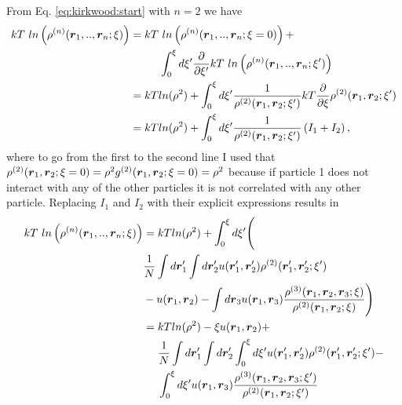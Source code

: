 From Eq. \eqref{eq:kirkwood:start} with $n=2$ we have
\begin{align}
kT~ln\left(\rho^{(n)}(\boldsymbol{r}_1,..,\boldsymbol{r}_n;\xi)\right) &=
     kT~ln\left(\rho^{(n)}(\boldsymbol{r}_1,..,\boldsymbol{r}_n;\xi=0)\right) + \nonumber \\
    &~~~~~~~~ \int_0^\xi d\xi' \frac{\partial}{\partial \xi'}
    kT~ln\left(\rho^{(n)}(\boldsymbol{r}_1,..,\boldsymbol{r}_n;\xi')\right) \\
&= kT ln(\rho^2) +
    \int_0^\xi d\xi'
    \frac{1}{\rho^{(2)}(\boldsymbol{r}_1,\boldsymbol{r}_2;\xi')} kT
        \frac{\partial}{\partial \xi}
    \rho^{(2)}(\boldsymbol{r}_1,\boldsymbol{r}_2;\xi') \\
&= kT ln(\rho^2) +
    \int_0^\xi d\xi'
    \frac{1}{\rho^{(2)}(\boldsymbol{r}_1,\boldsymbol{r}_2;\xi')} \left(I_1+I_2 \right),
\end{align}
where to go from the first to the second line I used that $\rho^{(2)}(\boldsymbol{r}_1,\boldsymbol{r}_2;\xi=0)=\rho^2 g^{(2)}(\boldsymbol{r}_1,\boldsymbol{r}_2;\xi=0) = \rho^2$ because if particle 1 does not interact with any of the other particles it is not correlated with any other particle.
Replacing $I_1$ and $I_2$ with their explicit expressions
results in
\begin{align}
kT~ln\left(\rho^{(n)}(\boldsymbol{r}_1,..,\boldsymbol{r}_n;\xi)\right)
&=
    kT ln(\rho^2) + \int_0^\xi d\xi' \Bigg( \nonumber \\
&    \frac{1}{N} \int d\boldsymbol{r}_1' \int d\boldsymbol{r}_2' u(\boldsymbol{r}_1',\boldsymbol{r}_2')
        \rho^{(2)}(\boldsymbol{r}_1',\boldsymbol{r}_2';\xi')
\nonumber \\
& -u(\boldsymbol{r}_1,\boldsymbol{r}_2)  - \int d\boldsymbol{r}_3 u(\boldsymbol{r}_1,\boldsymbol{r}_3)\frac{ \rho^{(3)}(\boldsymbol{r}_1,\boldsymbol{r}_2,\boldsymbol{r}_3;\xi)}{\rho^{(2)}(\boldsymbol{r}_1,\boldsymbol{r}_2;\xi)} \Bigg) \\
&= kT ln(\rho^2) - \xi u(\boldsymbol{r}_1,\boldsymbol{r}_2) + \nonumber \\
   &~~~~ \frac{1}{N} \int d\boldsymbol{r}_1' \int d\boldsymbol{r}_2' \int_0^\xi d\xi' u(\boldsymbol{r}_1',\boldsymbol{r}_2') \rho^{(2)}(\boldsymbol{r}_1',\boldsymbol{r}_2';\xi')
    -  \nonumber \\
&~~~~ \int_0^\xi d\xi' u(\boldsymbol{r}_1,\boldsymbol{r}_3) 
    \frac{\rho^{(3)}(\boldsymbol{r}_1,\boldsymbol{r}_2,\boldsymbol{r}_3;\xi')}
       {\rho^{(2)}(\boldsymbol{r}_1,\boldsymbol{r}_2;\xi')}
\end{align}




